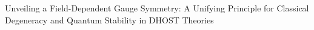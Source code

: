 \documentclass[twocolumn]{aastex631}
\begin{document}
Unveiling a Field-Dependent Gauge Symmetry: A Unifying Principle for Classical Degeneracy and Quantum Stability in DHOST Theories
\end{document}
